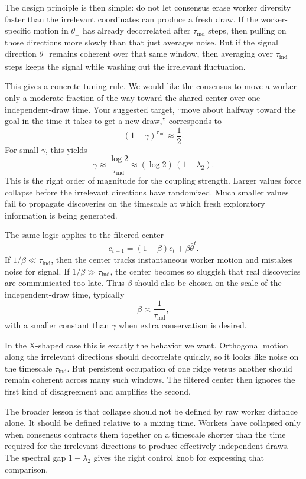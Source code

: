 \documentclass{article}
\begin{document}
The design principle is then simple: do not let consensus erase worker
diversity faster than the irrelevant coordinates can produce a fresh
draw. If the worker-specific motion in $\theta_{\perp}$ has already
decorrelated after $\tau_{\mathrm{ind}}$ steps, then pulling on those
directions more slowly than that just averages noise. But if the signal
direction $\theta_{\parallel}$ remains coherent over that same window,
then averaging over $\tau_{\mathrm{ind}}$ steps keeps the signal while
washing out the irrelevant fluctuation.

This gives a concrete tuning rule. We would like the consensus to move a
worker only a moderate fraction of the way toward the shared center over
one independent-draw time. Your suggested target, ``move about halfway
toward the goal in the time it takes to get a new draw,'' corresponds to
\[
(1-\gamma)^{\tau_{\mathrm{ind}}} \approx \frac{1}{2}.
\]
For small $\gamma$, this yields
\[
\gamma \approx \frac{\log 2}{\tau_{\mathrm{ind}}}
\approx (\log 2)\,(1-\lambda_2).
\]
This is the right order of magnitude for the coupling strength. Larger
values force collapse before the irrelevant directions have randomized.
Much smaller values fail to propagate discoveries on the timescale at
which fresh exploratory information is being generated.

The same logic applies to the filtered center
\[
c_{t+1} = (1-\beta)c_t + \beta \bar{\theta}^t.
\]
If $1/\beta \ll \tau_{\mathrm{ind}}$, then the center tracks
instantaneous worker motion and mistakes noise for signal. If
$1/\beta \gg \tau_{\mathrm{ind}}$, the center becomes so sluggish that
real discoveries are communicated too late. Thus $\beta$ should also be
chosen on the scale of the independent-draw time, typically
\[
\beta \asymp \frac{1}{\tau_{\mathrm{ind}}},
\]
with a smaller constant than $\gamma$ when extra conservatism is
desired.

In the X-shaped case this is exactly the behavior we want. Orthogonal
motion along the irrelevant directions should decorrelate quickly, so it
looks like noise on the timescale $\tau_{\mathrm{ind}}$. But persistent
occupation of one ridge versus another should remain coherent across many
such windows. The filtered center then ignores the first kind of
disagreement and amplifies the second.

The broader lesson is that collapse should not be defined by raw worker
distance alone. It should be defined relative to a mixing time. Workers
have collapsed only when consensus contracts them together on a
timescale shorter than the time required for the irrelevant directions
to produce effectively independent draws. The spectral gap
$1-\lambda_2$ gives the right control knob for expressing that
comparison.
\end{document}
